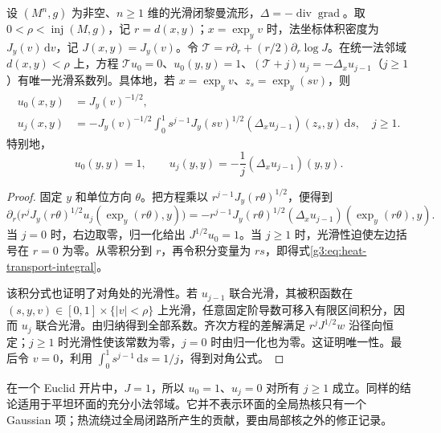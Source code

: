 \begin{proposition}\label{g3:prop:heat-transport-coefficients}
	设 \((M^n,g)\) 为非空、\(n\ge1\) 维的光滑闭黎曼流形，\(\Delta=-\operatorname{div}\operatorname{grad}\)。取 \(0<\rho<\operatorname{inj}(M,g)\)，记 \(r=d(x,y)\)；\(x=\exp_yv\) 时，法坐标体积密度为 \(J_y(v)\,\mathrm dv\)，记 \(J(x,y)=J_y(v)\)。令 \(\mathcal T=r\partial_r+(r/2)\partial_r\log J\)。在统一法邻域 \(d(x,y)<\rho\) 上，方程 \(\mathcal Tu_0=0\)、\(u_0(y,y)=1\)、\((\mathcal T+j)u_j=-\Delta_xu_{j-1}\)（\(j\ge1\)）有唯一光滑系数列。具体地，若 \(x=\exp_yv\)、\(z_s=\exp_y(sv)\)，则
	\begin{align}
		u_0(x,y)&=J_y(v)^{-1/2},\label{g3:eq:heat-u0-density}\\
		u_j(x,y)&=-J_y(v)^{-1/2}
		\int_0^1s^{j-1}J_y(sv)^{1/2}
		(\Delta_xu_{j-1})(z_s,y)\,\mathrm ds,
		\quad j\ge1.\label{g3:eq:heat-transport-integral}
	\end{align}
	特别地，
	\begin{equation}\label{g3:eq:heat-diagonal-recursion}
		u_0(y,y)=1,\qquad
		u_j(y,y)=-\frac1j(\Delta_xu_{j-1})(y,y).
	\end{equation}
\end{proposition}
\begin{proof}
	固定 \(y\) 和单位方向 \(\theta\)。把方程乘以 \(r^{j-1}J_y(r\theta)^{1/2}\)，便得到
	\[
		\partial_r\bigl(r^jJ_y(r\theta)^{1/2}u_j(\exp_y(r\theta),y)\bigr)
		=-r^{j-1}J_y(r\theta)^{1/2}
		(\Delta_xu_{j-1})(\exp_y(r\theta),y).
	\]
	当 \(j=0\) 时，右边取零，归一化给出 \(J^{1/2}u_0=1\)。当 \(j\ge1\) 时，光滑性迫使左边括号在 \(r=0\) 为零。从零积分到 \(r\)，再令积分变量为 \(rs\)，即得式\eqref{g3:eq:heat-transport-integral}。

	该积分式也证明了对角处的光滑性。若 \(u_{j-1}\) 联合光滑，其被积函数在 \((s,y,v)\in[0,1]\times\{|v|<\rho\}\) 上光滑，任意固定阶导数可移入有限区间积分，因而 \(u_j\) 联合光滑。由归纳得到全部系数。齐次方程的差解满足 \(r^jJ^{1/2}w\) 沿径向恒定；\(j\ge1\) 时光滑性使该常数为零，\(j=0\) 时由归一化也为零。这证明唯一性。最后令 \(v=0\)，利用 \(\int_0^1s^{j-1}\,\mathrm ds=1/j\)，得到对角公式。
\end{proof}

\begin{example}\label{g3:exm:flat-local-heat-coefficients}
	在一个 Euclid 开片中，\(J=1\)，所以 \(u_0=1\)、\(u_j=0\) 对所有 \(j\ge1\) 成立。同样的结论适用于平坦环面的充分小法邻域。它并不表示环面的全局热核只有一个 Gaussian 项；热流绕过全局闭路所产生的贡献，要由局部核之外的修正记录。
\end{example}

